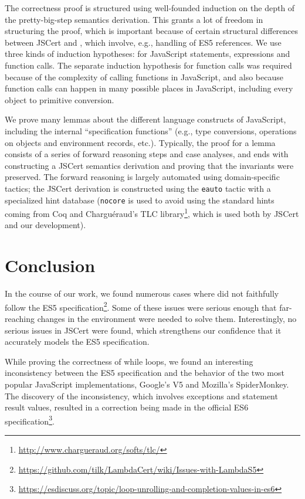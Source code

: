 \documentclass{sigplanconf}
\begin{document}
The correctness proof is structured using well-founded 
induction on the depth of the \lambdajs{} pretty-big-step
semantics derivation. This grants a lot of freedom in structuring
the proof, which is important because of certain structural
differences between JSCert and \lambdajs{}, which involve,
e.g., handling of ES5 references. We use three kinds of induction
hypotheses: for JavaScript statements, expressions and
function calls. The separate induction hypothesis for function
calls was required because of the complexity of calling functions
in JavaScript, and also because function calls can happen in
many possible places in JavaScript, including every
object to primitive conversion.

We prove many lemmas about the different language constructs
of JavaScript, including the internal ``specification functions''
(e.g., type conversions, operations on objects and environment
records, etc.). Typically, the proof for a lemma consists of
a series of forward reasoning steps and case analyses, and ends with
constructing a JSCert semantics derivation and proving that
the invariants were preserved. The forward reasoning is largely
automated using domain-specific tactics; the JSCert derivation
is constructed using the \texttt{eauto} tactic with a specialized
hint database (\texttt{nocore} is used to avoid using the standard
hints coming from Coq and Chargu\'eraud's TLC
library\footnote{\url{http://www.chargueraud.org/softs/tlc/}}, which is
used both by JSCert and our development).

\section{Conclusion}

In the course of our work, we found numerous cases where
\lambdajs{} did not faithfully follow the ES5 
specification\footnote{\url{https://github.com/tilk/LambdaCert/wiki/Issues-with-LambdaS5}}.
Some of these issues were serious enough that
far-reaching changes in the \lambdajs{} environment were needed
to solve them. Interestingly, no serious issues in JSCert were
found, which strengthens our confidence that it accurately models
the ES5 specification.

While proving the correctness of while loops, we found an interesting
inconsistency between the ES5 specification and the behavior
of the two most popular JavaScript implementations, Google's V5 and
Mozilla's SpiderMonkey. The discovery of the inconsistency,
which involves exceptions and statement result values,
resulted in a correction being made in the official ES6
specification\footnote{\url{https://esdiscuss.org/topic/loop-unrolling-and-completion-values-in-es6}}.
\end{document}
